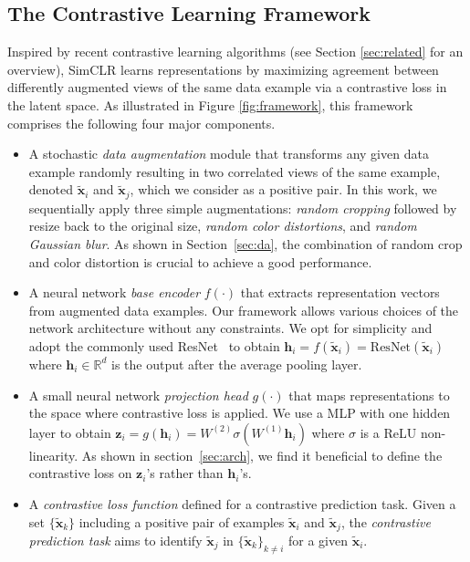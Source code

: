 \subsection{The Contrastive Learning Framework}

Inspired by recent contrastive learning algorithms (see Section \ref{sec:related} for an overview), SimCLR learns representations by maximizing agreement between differently augmented views of the same data example via a contrastive loss in the latent space. As illustrated in Figure \ref{fig:framework}, this framework comprises the following four major components.

\begin{itemize}[topsep=0pt, partopsep=0pt, leftmargin=13pt, parsep=0pt, itemsep=4pt]
    \item A stochastic \textit{data augmentation} module that transforms any given data example randomly resulting in two correlated views of the same example, denoted $\tilde{\bm x}_i$ and $\tilde{\bm x}_j$, which we consider as a positive pair. In this work, we sequentially apply three simple augmentations: \textit{random cropping} followed by resize back to the original size, \textit{random color distortions}, and \textit{random Gaussian blur}. As shown in Section~\ref{sec:da}, the combination of random crop and color distortion is crucial to achieve a good performance.
    \item A neural network \textit{base encoder} $f(\cdot)$ that extracts representation vectors from augmented data examples. Our framework allows various choices of the network architecture without any constraints. We opt for simplicity and adopt the commonly used ResNet~\cite{he2016deep} to obtain $\bm h_i = f(\tilde{\bm x}_i) = \mathrm{ResNet}(\tilde{\bm x}_i)$ where $\bm h_i\in \mathbb{R}^d$ is the output after the average pooling layer.
    \item A small neural network \textit{projection head} $g(\cdot)$ that maps representations to the space where contrastive loss is applied. We use a MLP with one hidden layer to obtain $\bm z_i = g(\bm h_i)=W^{(2)}\sigma(W^{(1)}\bm h_i)$ where $\sigma$ is a ReLU non-linearity. As shown in section~\ref{sec:arch}, we find it beneficial to define the contrastive loss on $\bm z_i$'s rather than $\bm h_i$'s. 
    \item A \textit{contrastive loss function} defined for a contrastive prediction task. Given a set $\{\tilde{\bm x}_k\}$ including a positive pair of examples $\tilde{\bm x}_i$ and $\tilde{\bm x}_j$, the \textit{contrastive prediction task} aims to identify $\tilde{\bm x}_j$ in $\{\tilde{\bm x}_k\}_{k\ne i}$ for a given $\tilde{\bm x}_i$.
\end{itemize}

